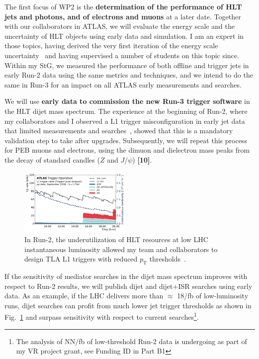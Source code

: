 The first focus of WP2 is the \textbf{determination of the performance of HLT jets and photons, and of electrons and muons} at a later date. 
Together with our collaborators in ATLAS, we will evaluate the energy scale and the uncertainty of HLT objects using early data and simulation. 
I am an expert in those topics, having derived the very first iteration of the energy scale uncertainty~\cite{ToBeCited} %
and having supervised a number of students on this topic since. 
Within my StG, we measured the performance of both offline and trigger jets in early Run-2 data using the same metrics and techniques, 
and we intend to do the same in Run-3 for an impact on all ATLAS early measurements and searches.  

We will use \textbf{early data to commission the new Run-3 trigger software} in the HLT dijet mass spectrum. 
The experience at the beginning of Run-2, where my collaborators and I observed a L1 trigger misconfiguration in early jet data that limited measurements and searches~\cite{Collaboration:2035503}, showed that this is a mandatory validation step to take after upgrades. 
Subsequently, we will repeat this process for PEB muons and electrons, using the dimuon and dielectron mass peaks from the decay of standard candles ($Z$ and $J/\psi$) \textbf{[10]}. 

\begin{figure} 
\begin{center}
\includegraphics[width=0.48\textwidth]{figs_B2/TLAPublicWinter2019_L1Lumi.pdf}
\caption{\color{black}\label{fig:triggerLowThreshold} \small In Run-2, the underutilization of HLT resources at low LHC instantaneous luminosity allowed my team and collaborators to design TLA L1 triggers with reduced $p_\mathrm{T}$ thresholds~\cite{ToBeCited}.} %
\vskip2pt
\end{center}
\end{figure}

If the sensitivity of mediator searches in the dijet mass spectrum improves with respect to Run-2 results, we will publish dijet and dijet+ISR searches using early data.
As an example, if the LHC delivers more than $\approx$ 18/fb of low-luminosity runs, dijet searches can profit from much lower jet trigger thresholds as shown in Fig.~\ref{fig:triggerLowThreshold} and surpass sensitivity with respect to current searches\footnote{The analysis of NN/fb of low-threshold Run-2 data is undergoing as part of my VR project grant, see Funding ID in Part B1}. 

